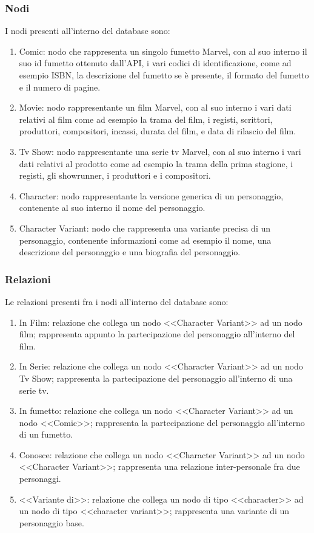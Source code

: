 \documentclass[
12pt, %
a4paper, %
oneside, %
headinclude,footinclude, %
BCOR5mm, %
]{scrartcl}
\begin{document}
\subsubsection{Nodi}
I nodi presenti all'interno del database sono:
\begin{enumerate}
	\item Comic: nodo che rappresenta un singolo fumetto Marvel, con al suo interno il suo id fumetto ottenuto dall'API, i vari codici di identificazione, come ad esempio ISBN, la descrizione del fumetto se è presente, il formato del fumetto e il numero di pagine.
	\item Movie: nodo rappresentante un film Marvel, con al suo interno i vari dati relativi al film come ad esempio la trama del film, i registi, scrittori, produttori, compositori, incassi, durata del film, e data di rilascio del film.
	\item Tv Show: nodo rappresentante una serie tv Marvel, con al suo interno i vari dati relativi al prodotto come ad esempio la trama della prima stagione, i registi, gli showrunner, i produttori e i compositori.
	\item Character: nodo rappresentante la versione generica di un personaggio, contenente al suo interno il nome del personaggio.
	\item Character Variant: nodo che rappresenta una variante precisa di un personaggio, contenente informazioni come ad esempio il nome, una descrizione del personaggio e una biografia del personaggio.
\end{enumerate}
\subsubsection{Relazioni}
Le relazioni presenti fra i nodi all'interno del database sono:
\begin{enumerate}
	\item In Film: relazione che collega un nodo <<Character Variant>> ad un nodo film; rappresenta appunto la partecipazione del personaggio all'interno del film.
	\item In Serie: relazione che collega un nodo <<Character Variant>> ad un nodo Tv Show; rappresenta la partecipazione del personaggio all'interno di una serie tv.
	\item In fumetto: relazione che collega un nodo <<Character Variant>> ad un nodo <<Comic>>; rappresenta la partecipazione del personaggio all'interno di un fumetto.
	\item Conosce: relazione che collega un nodo <<Character Variant>> ad un nodo <<Character Variant>>; rappresenta una relazione inter-personale fra due personaggi.
	\item <<Variante di>>: relazione che collega un nodo di tipo <<character>> ad un nodo di tipo <<character variant>>; rappresenta una variante di un personaggio base.
\end{enumerate}
\end{document}
